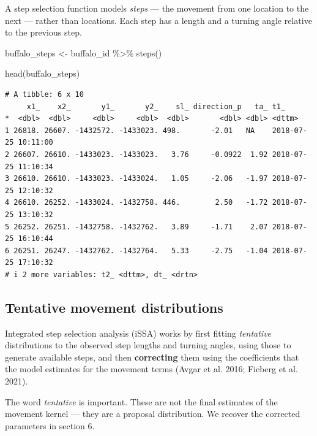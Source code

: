 \documentclass[
  letterpaper,
  DIV=11,
  numbers=noendperiod]{scrartcl}
\newenvironment{Shaded}{\begin{snugshade}}{\end{snugshade}}
\newcommand{\FunctionTok}[1]{\textcolor[rgb]{0.28,0.35,0.67}{#1}}
\newcommand{\NormalTok}[1]{\textcolor[rgb]{0.00,0.23,0.31}{#1}}
\newcommand{\OtherTok}[1]{\textcolor[rgb]{0.00,0.23,0.31}{#1}}
\newcommand{\SpecialCharTok}[1]{\textcolor[rgb]{0.37,0.37,0.37}{#1}}
\begin{document}
A step selection function models \emph{steps} --- the movement from one
location to the next --- rather than locations. Each step has a length
and a turning angle relative to the previous step.

\begin{Shaded}
\begin{Highlighting}[]
\NormalTok{buffalo\_steps }\OtherTok{\textless{}{-}}\NormalTok{ buffalo\_id }\SpecialCharTok{\%\textgreater{}\%} \FunctionTok{steps}\NormalTok{()}

\FunctionTok{head}\NormalTok{(buffalo\_steps)}
\end{Highlighting}
\end{Shaded}

\begin{verbatim}
# A tibble: 6 x 10
     x1_    x2_       y1_       y2_    sl_ direction_p   ta_ t1_                
*  <dbl>  <dbl>     <dbl>     <dbl>  <dbl>       <dbl> <dbl> <dttm>             
1 26818. 26607. -1432572. -1433023. 498.       -2.01   NA    2018-07-25 10:11:00
2 26607. 26610. -1433023. -1433023.   3.76     -0.0922  1.92 2018-07-25 11:10:34
3 26610. 26610. -1433023. -1433024.   1.05     -2.06   -1.97 2018-07-25 12:10:32
4 26610. 26252. -1433024. -1432758. 446.        2.50   -1.72 2018-07-25 13:10:32
5 26252. 26251. -1432758. -1432762.   3.89     -1.71    2.07 2018-07-25 16:10:44
6 26251. 26247. -1432762. -1432764.   5.33     -2.75   -1.04 2018-07-25 17:10:32
# i 2 more variables: t2_ <dttm>, dt_ <drtn>
\end{verbatim}

\subsection{Tentative movement
distributions}\label{tentative-movement-distributions}

Integrated step selection analysis (iSSA) works by first fitting
\emph{tentative} distributions to the observed step lengths and turning
angles, using those to generate available steps, and then
\textbf{correcting} them using the coefficients that the model estimates
for the movement terms (Avgar et al. 2016; Fieberg et al. 2021).

The word \emph{tentative} is important. These are not the final
estimates of the movement kernel --- they are a proposal distribution.
We recover the corrected parameters in section 6.
\end{document}
